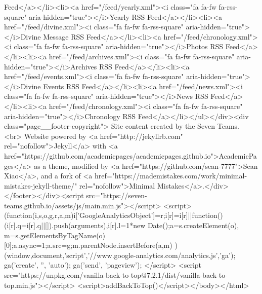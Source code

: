 Feed</a></li><li><a href="/feed/yearly.xml"><i class="fa fa-fw fa-rss-square" aria-hidden="true"></i>Yearly RSS Feed</a></li><li><a href="/feed/divine.xml"><i class="fa fa-fw fa-rss-square" aria-hidden="true"></i>Divine Message RSS Feed</a></li><li><a href="/feed/chronology.xml"><i class="fa fa-fw fa-rss-square" aria-hidden="true"></i>Photos RSS Feed</a></li><li><a href="/feed/archives.xml"><i class="fa fa-fw fa-rss-square" aria-hidden="true"></i>Archives RSS Feed</a></li><li><a href="/feed/events.xml"><i class="fa fa-fw fa-rss-square" aria-hidden="true"></i>Divine Events RSS Feed</a></li><li><a href="/feed/news.xml"><i class="fa fa-fw fa-rss-square" aria-hidden="true"></i>News RSS Feed</a></li><li><a href="/feed/chronology.xml"><i class="fa fa-fw fa-rss-square" aria-hidden="true"></i>Chronology RSS Feed</a></li></ul></div><div class="page__footer-copyright"> Site content created by the Seven Teams. <br> Website powered by <a href="http://jekyllrb.com" rel="nofollow">Jekyll</a> with <a href="https://github.com/academicpages/academicpages.github.io">AcademicPages</a> as a theme, modified by <a href="https://github.com/sean-7777">Sean Xiao</a>, and a fork of <a href="https://mademistakes.com/work/minimal-mistakes-jekyll-theme/" rel="nofollow">Minimal Mistakes</a>.</div></footer></div><script src="https://seven-teams.github.io/assets/js/main.min.js"></script> <script> (function(i,s,o,g,r,a,m){i['GoogleAnalyticsObject']=r;i[r]=i[r]||function(){ (i[r].q=i[r].q||[]).push(arguments)},i[r].l=1*new Date();a=s.createElement(o), m=s.getElementsByTagName(o)[0];a.async=1;a.src=g;m.parentNode.insertBefore(a,m) })(window,document,'script','//www.google-analytics.com/analytics.js','ga'); ga('create', '', 'auto'); ga('send', 'pageview'); </script> <script src="https://unpkg.com/vanilla-back-to-top@7.2.1/dist/vanilla-back-to-top.min.js"></script> <script>addBackToTop()</script></body></html>
